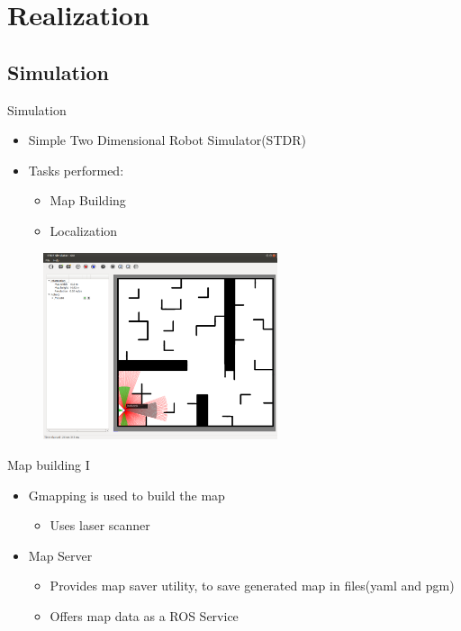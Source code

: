 \documentclass[12pt,aspectratio=43,xcolor={usenames,dvipsnames,table}]{beamer}
\begin{document}
\section{Realization}
\subsection{Simulation}

\begin{frame}{Simulation}
\begin{itemize}
	\item Simple Two Dimensional Robot Simulator(STDR)	
	\item Tasks  performed:
		\begin{itemize}
			\item Map Building
			\item Localization
		\end{itemize}
\end{itemize}

    	\centering
    	\includegraphics[width=90mm,height=55mm]{gfx/stdr_simulator}

\end{frame}
\begin{frame}{Map building I}
\begin{itemize}
	\item Gmapping is used to build the map
		\begin{itemize}
			\item Uses laser scanner 
		\end{itemize}
	\item Map Server
		\begin{itemize}
			\item Provides map saver utility, to save generated map in files(yaml and pgm)
			\item Offers map data as a ROS Service
		\end{itemize}
	
\end{itemize}
\end{frame}
\end{document}
